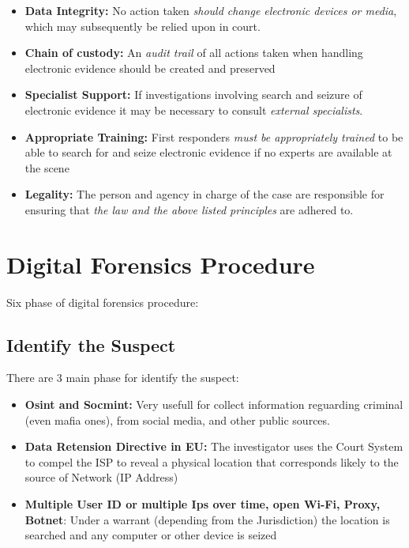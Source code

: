 \begin{itemize}
    \item \textbf{Data Integrity:} No action taken \textit{should change electronic devices or media}, 
    which may subsequently be relied upon in court.
    \item \textbf{Chain of custody:} An \textit{audit trail} of all actions taken when handling electronic 
    evidence should be created and preserved
    \item \textbf{Specialist Support:} If investigations involving search and seizure of electronic 
    evidence it may be necessary to consult \textit{external specialists}. 
    \item \textbf{Appropriate Training:} First responders \textit{must be appropriately trained} to be able 
    to search for and seize electronic evidence if no experts are available at the scene
    \item \textbf{Legality:} The person and agency in charge of the case are responsible 
    for ensuring that \textit{the law and the above listed principles} are adhered to. 
\end{itemize}

\section{Digital Forensics Procedure}
Six phase of digital forensics procedure:

\subsection{Identify the Suspect}
There are 3 main phase for identify the suspect:

\begin{itemize}
    \item \textbf{Osint and Socmint:} Very usefull for collect information reguarding criminal 
    (even mafia ones), from social media, and other public sources.
    \item \textbf{Data Retension Directive in EU:} The investigator uses the Court 
    System to compel the ISP to reveal a physical location that 
    corresponds likely to the source of Network (IP Address)
    \item \textbf{Multiple User ID or multiple 
    Ips over time,  open Wi-Fi, Proxy, Botnet}: Under a warrant (depending from the Jurisdiction) 
    the location is searched and any computer or other device is seized
\end{itemize}

